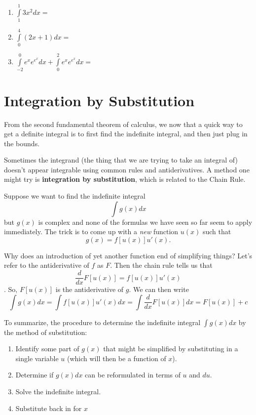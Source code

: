 \documentclass[]{book}
\providecommand{\tightlist}{%
  \setlength{\itemsep}{0pt}\setlength{\parskip}{0pt}}
\theoremstyle{definition}
\theoremstyle{definition}
\theoremstyle{definition}
\theoremstyle{remark}
\begin{document}
\begin{enumerate}
\def\labelenumi{\arabic{enumi}.}
\tightlist
\item
  \(\int\limits_1^1 3x^2 dx =\)
\item
  \(\int\limits_0^4 (2x+1)dx=\)
\item
  \(\int\limits_{-2}^0 e^x e^{e^x} dx + \int\limits_0^2 e^x e^{e^x} dx =\)
\end{enumerate}

\hypertarget{integration-by-substitution}{%
\section{Integration by Substitution}\label{integration-by-substitution}}

From the second fundamental theorem of calculus, we now that a quick way to get a definite integral is to first find the indefinite integral, and then just plug in the bounds.

Sometimes the integrand (the thing that we are trying to take an integral of) doesn't appear integrable using common rules and antiderivatives. A method one might try is \textbf{integration by substitution}, which is related to the Chain Rule.

Suppose we want to find the indefinite integral \[\int g(x)dx\] but \(g(x)\) is complex and none of the formulas we have seen so far seem to apply immediately. The trick is to come up with a \emph{new} function \(u(x)\) such that \[g(x)=f[u(x)]u'(x).\]

Why does an introduction of yet another function end of simplifying things? Let's refer to the antiderivative of \(f\) as \(F\). Then the chain rule tells us that \[\frac{d}{dx} F[u(x)]=f[u(x)]u'(x)\]. So, \(F[u(x)]\) is the antiderivative of \(g\). We can then write \[\int g(x) dx= \int f[u(x)]u'(x)dx = \int \frac{d}{dx} F[u(x)]dx = F[u(x)]+c\]

To summarize, the procedure to determine the indefinite integral \(\int g(x)dx\) by the method of substitution:

\begin{enumerate}
\def\labelenumi{\arabic{enumi}.}
\tightlist
\item
  Identify some part of \(g(x)\) that might be simplified by substituting in a single variable \(u\) (which will then be a function of \(x\)).
\item
  Determine if \(g(x)dx\) can be reformulated in terms of \(u\) and \(du\).
\item
  Solve the indefinite integral.
\item
  Substitute back in for \(x\)
\end{enumerate}
\end{document}
